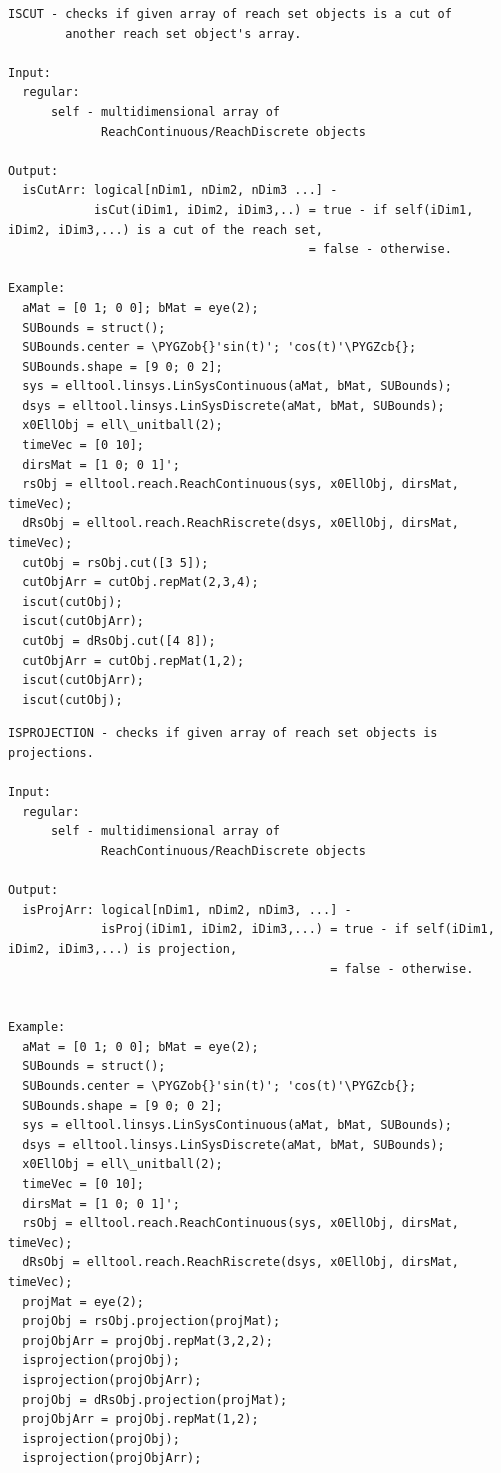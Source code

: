 \documentclass[letterpaper,10pt,english]{sphinxmanual}
\def\PYGZob{\char`\{}
\def\PYGZcb{\char`\}}
\begin{document}
\label{chap_func:elltool-reach-areach-iscut}
\begin{Verbatim}[commandchars=\\\{\}]
ISCUT - checks if given array of reach set objects is a cut of
        another reach set object's array.

Input:
  regular:
      self - multidimensional array of
             ReachContinuous/ReachDiscrete objects

Output:
  isCutArr: logical[nDim1, nDim2, nDim3 ...] -
            isCut(iDim1, iDim2, iDim3,..) = true - if self(iDim1, iDim2, iDim3,...) is a cut of the reach set,
                                          = false - otherwise.

Example:
  aMat = [0 1; 0 0]; bMat = eye(2);
  SUBounds = struct();
  SUBounds.center = \PYGZob{}'sin(t)'; 'cos(t)'\PYGZcb{};
  SUBounds.shape = [9 0; 0 2];
  sys = elltool.linsys.LinSysContinuous(aMat, bMat, SUBounds);
  dsys = elltool.linsys.LinSysDiscrete(aMat, bMat, SUBounds);
  x0EllObj = ell\_unitball(2);
  timeVec = [0 10];
  dirsMat = [1 0; 0 1]';
  rsObj = elltool.reach.ReachContinuous(sys, x0EllObj, dirsMat, timeVec);
  dRsObj = elltool.reach.ReachRiscrete(dsys, x0EllObj, dirsMat, timeVec);
  cutObj = rsObj.cut([3 5]);
  cutObjArr = cutObj.repMat(2,3,4);
  iscut(cutObj);
  iscut(cutObjArr);
  cutObj = dRsObj.cut([4 8]);
  cutObjArr = cutObj.repMat(1,2);
  iscut(cutObjArr);
  iscut(cutObj);
\end{Verbatim}
\label{chap_func:elltool-reach-areach-isprojection}
\begin{Verbatim}[commandchars=\\\{\}]
ISPROJECTION - checks if given array of reach set objects is projections.

Input:
  regular:
      self - multidimensional array of
             ReachContinuous/ReachDiscrete objects

Output:
  isProjArr: logical[nDim1, nDim2, nDim3, ...] -
             isProj(iDim1, iDim2, iDim3,...) = true - if self(iDim1, iDim2, iDim3,...) is projection,
                                             = false - otherwise.


Example:
  aMat = [0 1; 0 0]; bMat = eye(2);
  SUBounds = struct();
  SUBounds.center = \PYGZob{}'sin(t)'; 'cos(t)'\PYGZcb{};
  SUBounds.shape = [9 0; 0 2];
  sys = elltool.linsys.LinSysContinuous(aMat, bMat, SUBounds);
  dsys = elltool.linsys.LinSysDiscrete(aMat, bMat, SUBounds);
  x0EllObj = ell\_unitball(2);
  timeVec = [0 10];
  dirsMat = [1 0; 0 1]';
  rsObj = elltool.reach.ReachContinuous(sys, x0EllObj, dirsMat, timeVec);
  dRsObj = elltool.reach.ReachRiscrete(dsys, x0EllObj, dirsMat, timeVec);
  projMat = eye(2);
  projObj = rsObj.projection(projMat);
  projObjArr = projObj.repMat(3,2,2);
  isprojection(projObj);
  isprojection(projObjArr);
  projObj = dRsObj.projection(projMat);
  projObjArr = projObj.repMat(1,2);
  isprojection(projObj);
  isprojection(projObjArr);
\end{Verbatim}
\end{document}
